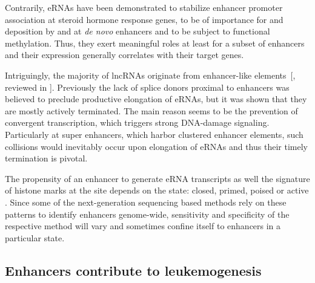 Contrarily, eRNAs have been demonstrated to stabilize enhancer promoter association at steroid hormone response genes\cite{Wang2011,Li2013a}, to be of importance for \hisfourone and \hisfourtwo deposition by  and  at \emph{de novo} enhancers\cite{Kaikkonen2013} and to be subject to functional methylation\cite{Aguilo2016}. Thus, they exert meaningful roles at least for a subset of enhancers  and their expression generally correlates with their target genes\cite{Arner2015}.

Intriguingly, the majority of lncRNAs originate from enhancer-like elements~[, reviewed in ]. Previously the lack of splice donors\cite{Fong2001} proximal to enhancers was believed to preclude productive elongation of eRNAs\cite{Core2014}, but it was shown that they are mostly actively terminated\cite{Austenaa2015}. The main reason seems to be the prevention of convergent transcription\cite{CQuaresma2016,Flynn2016}, which triggers strong DNA-damage signaling\cite{Meng2014}. Particularly at super enhancers, which harbor clustered enhancer elements, such  collisions would inevitably occur upon elongation of eRNAs and thus their timely termination is pivotal\cite{Meng2014}. 

The propensity of an enhancer to generate eRNA transcripts as well the signature of histone marks at the site\cite{Ernst2010,CaloWysocka2013} depends on the state: closed, primed, poised or active . Since some of the next-generation sequencing based methods rely on these patterns to identify enhancers genome-wide, sensitivity and specificity of the respective method will vary and sometimes confine itself to enhancers in a particular state. 


\subsection{Enhancers contribute to leukemogenesis}
\label{chap:i:abridged:enhancers:leukemia}

